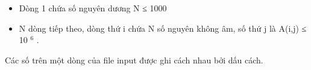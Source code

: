 \begin{itemize}
	\item     Dòng 1 chứa số nguyên dương N ≤ 1000   
	\item     N dòng tiếp theo, dòng thứ i chứa N số nguyên không âm, số thứ j là A(i,j)         ≤ 10     $^      6     $     .    
\end{itemize}

   Các số trên một dòng của file input được ghi cách nhau bởi dấu cách.  

\